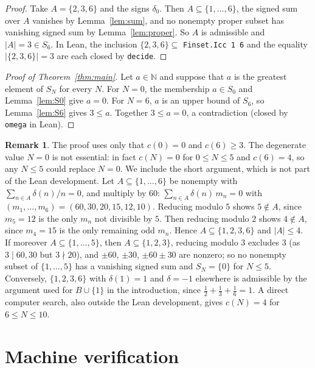 \documentclass[11pt]{amsart}
\theoremstyle{plain}
\theoremstyle{definition}
\newtheorem{remark}[theorem]{Remark}
\newcommand{\N}{\mathbb{N}}
\begin{document}
\begin{proof}
Take $A=\{2,3,6\}$ and the signs $\delta_0$. Then $A\subseteq\{1,\dots,6\}$, the signed sum over $A$ vanishes by Lemma~\ref{lem:sum}, and no nonempty proper subset has vanishing signed sum by Lemma~\ref{lem:proper}. So $A$ is admissible and $|A|=3\in S_6$. In Lean, the inclusion $\{2,3,6\}\subseteq$ \texttt{Finset.Icc 1 6} and the equality $|\{2,3,6\}|=3$ are each closed by \texttt{decide}.
\end{proof}

\begin{proof}[Proof of Theorem~\ref{thm:main}]
Let $a\in\N$ and suppose that $a$ is the greatest element of $S_N$ for every $N$. For $N=0$, the membership $a\in S_0$ and Lemma~\ref{lem:S0} give $a=0$. For $N=6$, $a$ is an upper bound of $S_6$, so Lemma~\ref{lem:S6} gives $3\le a$. Together $3\le a=0$, a contradiction (closed by \texttt{omega} in Lean).
\end{proof}

\begin{remark}\label{rem:values}
The proof uses only that $c(0)=0$ and $c(6)\ge 3$. The degenerate value $N=0$ is not essential: in fact $c(N)=0$ for $0\le N\le 5$ and $c(6)=4$, so any $N\le 5$ could replace $N=0$. We include the short argument, which is not part of the Lean development. Let $A\subseteq\{1,\dots,6\}$ be nonempty with $\sum_{n\in A}\delta(n)/n=0$, and multiply by $60$: $\sum_{n\in A}\delta(n)\,m_n=0$ with $(m_1,\dots,m_6)=(60,30,20,15,12,10)$. Reducing modulo $5$ shows $5\notin A$, since $m_5=12$ is the only $m_n$ not divisible by $5$. Then reducing modulo $2$ shows $4\notin A$, since $m_4=15$ is the only remaining odd $m_n$. Hence $A\subseteq\{1,2,3,6\}$ and $|A|\le 4$. If moreover $A\subseteq\{1,\dots,5\}$, then $A\subseteq\{1,2,3\}$, reducing modulo $3$ excludes $3$ (as $3\mid 60,30$ but $3\nmid 20$), and $\pm60$, $\pm30$, $\pm60\pm30$ are nonzero; so no nonempty subset of $\{1,\dots,5\}$ has a vanishing signed sum and $S_N=\{0\}$ for $N\le 5$. Conversely, $\{1,2,3,6\}$ with $\delta(1)=1$ and $\delta=-1$ elsewhere is admissible by the argument used for $B\cup\{1\}$ in the introduction, since $\frac12+\frac13+\frac16=1$. A direct computer search, also outside the Lean development, gives $c(N)=4$ for $6\le N\le 10$.
\end{remark}

\section{Machine verification}\label{sec:lean}
\end{document}

